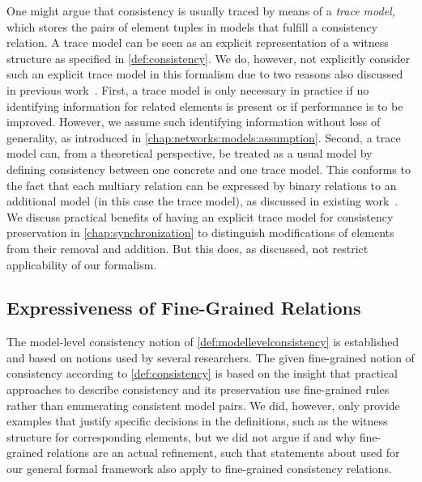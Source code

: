 One might argue that consistency is usually traced by means of a \emph{trace model}, which stores the pairs of element tuples in models that fulfill a consistency relation.
A trace model can be seen as an explicit representation of a witness structure as specified in \autoref{def:consistency}.
We do, however, not explicitly consider such an explicit trace model in this formalism due to two reasons also discussed in previous work~.
First, a trace model is only necessary in practice if no identifying information for related elements is present or if performance is to be improved.
However, we assume such identifying information without loss of generality, as introduced in \autoref{chap:networks:models:assumption}.
Second, a trace model can, from a theoretical perspective, be treated as a usual model by defining consistency between one concrete and one trace model. This conforms to the fact that each multiary relation can be expressed by binary relations to an additional model (in this case the trace model), as discussed in existing work~\cite{stevens2020BidirectionalTransformationLarge-SoSym, cleve2019dagstuhl}.
We discuss practical benefits of having an explicit trace model for consistency preservation in \autoref{chap:synchronization} to distinguish modifications of elements from their removal and addition.
But this does, as discussed, not restrict applicability of our formalism.


\subsection{Expressiveness of Fine-Grained Relations} %

The model-level consistency notion of \autoref{def:modellevelconsistency} is established and based on notions used by several researchers.
The given fine-grained notion of consistency according to \autoref{def:consistency} is based on the insight that practical approaches to describe consistency and its preservation use fine-grained rules rather than enumerating consistent model pairs.
We did, however, only provide examples that justify specific decisions in the definitions, such as the witness structure for corresponding elements, but we did not argue if and why fine-grained relations are an actual refinement, such that statements about \modellevelconsistencyrelation used for our general formal framework also apply to fine-grained consistency relations.

